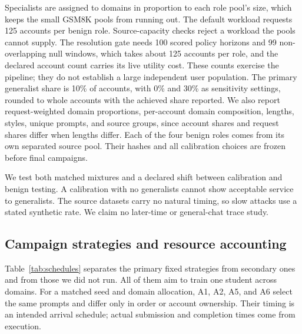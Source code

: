 \documentclass[journal]{IEEEtran}
\begin{document}
Specialists are assigned to domains in proportion to each role pool's size, which keeps the small GSM8K pools from running out. The default workload requests 125 accounts per benign role. Source-capacity checks reject a workload the pools cannot supply. The resolution gate needs 100 scored policy horizons and 99 non-overlapping null windows, which takes about 125 accounts per role, and the declared account count carries its live utility cost. These counts exercise the pipeline; they do not establish a large independent user population. The primary generalist share is 10\% of accounts, with 0\% and 30\% as sensitivity settings, rounded to whole accounts with the achieved share reported. We also report request-weighted domain proportions, per-account domain composition, lengths, styles, unique prompts, and source groups, since account shares and request shares differ when lengths differ. Each of the four benign roles comes from its own separated source pool. Their hashes and all calibration choices are frozen before final campaigns.

We test both matched mixtures and a declared shift between calibration and benign testing. A calibration with no generalists cannot show acceptable service to generalists. The source datasets carry no natural timing, so slow attacks use a stated synthetic rate. We claim no later-time or general-chat trace study.

\subsection{Campaign strategies and resource accounting}
\label{sec:attacks}
Table~\ref{tab:schedules} separates the primary fixed strategies from secondary ones and from those we did not run. All of them aim to train one student across domains. For a matched seed and domain allocation, A1, A2, A5, and A6 select the same prompts and differ only in order or account ownership. Their timing is an intended arrival schedule; actual submission and completion times come from execution.
\end{document}
